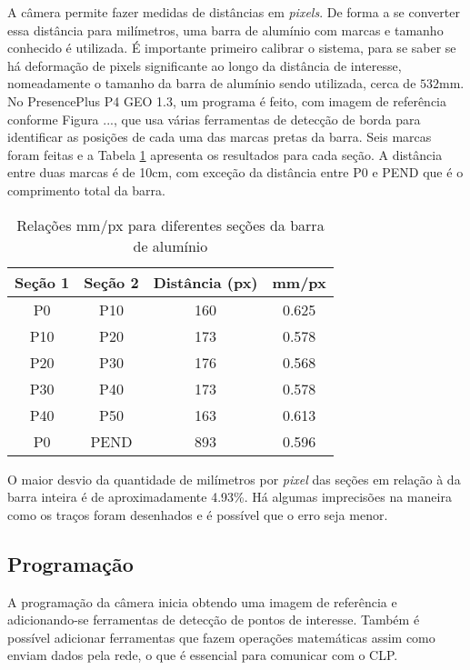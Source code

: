 A câmera permite fazer medidas de distâncias em \textit{pixels}. De forma a se converter essa distância para milímetros, uma barra de alumínio com marcas e tamanho conhecido é utilizada. É importante primeiro calibrar o sistema, para se saber se há deformação de pixels significante ao longo da distância de interesse, nomeadamente o tamanho da barra de alumínio sendo utilizada, cerca de $532$mm. No PresencePlus P4 GEO 1.3, um programa é feito, com imagem de referência conforme Figura ..., que usa várias ferramentas de detecção de borda para identificar as posições de cada uma das marcas pretas da barra.  Seis marcas foram feitas e a Tabela \ref{relacoesmmpx} apresenta os resultados para cada seção. A distância entre duas marcas é de 10cm, com exceção da distância entre P0 e PEND que é o comprimento total da barra.

\begin{table}[!ht]
\centering
\caption{Relações mm/px para diferentes seções da barra de alumínio \label{relacoesmmpx}}
	\begin{tabular}{|c|c|c|c|}
	\hline
		Seção 1 & Seção 2 & Distância (px) & mm/px\\ \hline
		P0 & P10 & 160 & 0.625\\ \hline
		P10 & P20 & 173 & 0.578\\ \hline
		P20 & P30 & 176 & 0.568\\ \hline
		P30 & P40 & 173 & 0.578\\ \hline
		P40 & P50 & 163 & 0.613\\ \hline
		P0 & PEND & 893 & 0.596\\ \hline
	\end{tabular}
\end{table}

O maior desvio da quantidade de milímetros por \textit{pixel} das seções em relação à da barra inteira é de aproximadamente 4.93\%. Há algumas imprecisões na maneira como os traços foram desenhados e é possível que o erro seja menor.

\subsection{Programação}
A programação da câmera inicia obtendo uma imagem de referência e adicionando-se ferramentas de detecção de pontos de interesse. Também é possível adicionar ferramentas que fazem operações matemáticas assim como enviam dados pela rede, o que é essencial para comunicar com o CLP.

